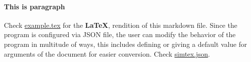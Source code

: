 \documentclass[12pt, UTF8]{article}
\begin{document}
	\paragraph{This is paragraph}
	
	Check \href{./example.tex}{example.tex} for the \textbf{LaTeX}, rendition of this markdown file. Since the program is configured via JSON file, the user can modify the behavior of the program in multitude of ways, this includes defining or giving a default value for arguments of the document for easier conversion. Check \href{https://github.com/iaacornus/simtex/blob/devel/examples/config/simtex.json}{simtex.json}.
\end{document}
